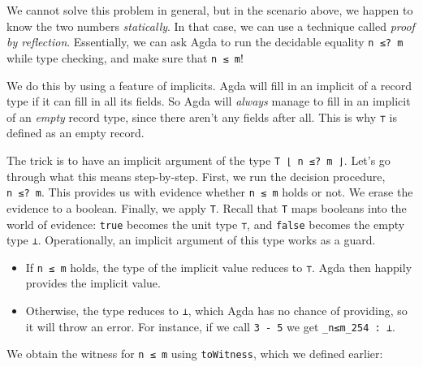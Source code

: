 We cannot solve this problem in general, but in the scenario above, we
happen to know the two numbers \emph{statically}. In that case, we can
use a technique called \emph{proof by reflection}. Essentially, we can
ask Agda to run the decidable equality \texttt{n\ ≤?\ m} while type
checking, and make sure that \texttt{n\ ≤\ m}!

We do this by using a feature of implicits. Agda will fill in an
implicit of a record type if it can fill in all its fields. So Agda will
\emph{always} manage to fill in an implicit of an \emph{empty} record
type, since there aren't any fields after all. This is why \texttt{⊤} is
defined as an empty record.

The trick is to have an implicit argument of the type
\texttt{T\ ⌊\ n\ ≤?\ m\ ⌋}. Let's go through what this means
step-by-step. First, we run the decision procedure, \texttt{n\ ≤?\ m}.
This provides us with evidence whether \texttt{n\ ≤\ m} holds or not. We
erase the evidence to a boolean. Finally, we apply \texttt{T}. Recall
that \texttt{T} maps booleans into the world of evidence: \texttt{true}
becomes the unit type \texttt{⊤}, and \texttt{false} becomes the empty
type \texttt{⊥}. Operationally, an implicit argument of this type works
as a guard.

\begin{itemize}
\tightlist
\item
  If \texttt{n\ ≤\ m} holds, the type of the implicit value reduces to
  \texttt{⊤}. Agda then happily provides the implicit value.
\item
  Otherwise, the type reduces to \texttt{⊥}, which Agda has no chance of
  providing, so it will throw an error. For instance, if we call
  \texttt{3\ -\ 5} we get \texttt{\_n≤m\_254\ :\ ⊥}.
\end{itemize}

We obtain the witness for \texttt{n\ ≤\ m} using \texttt{toWitness},
which we defined earlier:

\begin{fence}
\begin{code}%
\>[0]\AgdaOperator{\AgdaFunction{\AgdaUnderscore{}-\AgdaUnderscore{}}}\AgdaSpace{}%
\AgdaSymbol{:}\AgdaSpace{}%
\AgdaSymbol{(}\AgdaSpace{}%
\AgdaSpace{}%
\AgdaSymbol{:}\AgdaSpace{}%
\AgdaSymbol{)}\AgdaSpace{}%
\AgdaSymbol{\{}\AgdaSpace{}%
\AgdaSymbol{:}\AgdaSpace{}%
\AgdaSpace{}%
\AgdaSpace{}%
\AgdaSpace{}%
\AgdaSpace{}%
\AgdaSpace{}%
\AgdaSymbol{\}}\AgdaSpace{}%
\AgdaSpace{}%
\<%
\\
\>[0]\AgdaOperator{\AgdaFunction{\AgdaUnderscore{}-\AgdaUnderscore{}}}\AgdaSpace{}%
\AgdaSpace{}%
\AgdaSpace{}%
\AgdaSymbol{\{}\AgdaSymbol{\}}\AgdaSpace{}%
\AgdaSymbol{=}\AgdaSpace{}%
\AgdaSpace{}%
\AgdaSpace{}%
\AgdaSpace{}%
\AgdaSymbol{(}\AgdaSpace{}%
\AgdaSymbol{)}\<%
\end{code}
\end{fence}

